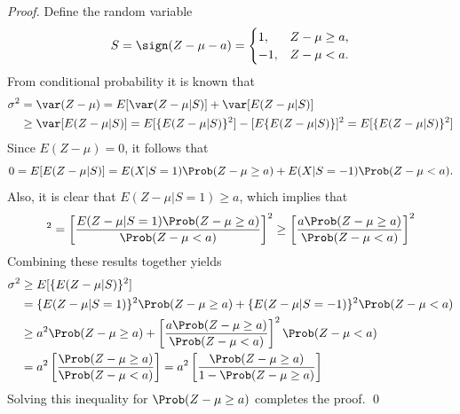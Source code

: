 \documentclass[graybox]{svmult}
\begin{document}
\begin{proof}Define the random variable
\[ S=\sign(Z - \mu - a) = \begin{cases} 1, & Z - \mu \geq a,\\ -1, & Z - \mu <a. \end{cases}
\]
From conditional probability it is known that
\begin{align*}
\sigma^2 &= \var(Z-\mu)=E[\var(Z-\mu|S)]+\var[E(Z-\mu|S)] \\
&\geq\var[E(Z-\mu|S)]= E[\{E(Z-\mu|S)\}^2]-[E\{E(Z-\mu|S)\}]^2 =  E[\{E(Z-\mu|S)\}^2]
\end{align*}
Since $E(Z-\mu)=0$, it follows that
\begin{equation*}
0= E[E(Z-\mu|S)]=E(X|S=1)\Prob(Z - \mu \geq a)+E(X|S=-1)\Prob(Z - \mu < a).
\end{equation*}
Also, it is clear that $E(Z - \mu|S=1) \ge a$, which implies that
\begin{equation*}
[E(Z - \mu|S=-1)]^2=\left[\frac{E(Z - \mu|S=1)\Prob(Z - \mu \geq a)}{\Prob(Z - \mu < a)}\right]^2\geq \left[\frac{a\Prob(Z - \mu \geq a)}{\Prob(Z - \mu < a)}\right]^2
\end{equation*}
Combining these results together yields
\begin{align*}
\sigma^2 & \ge E[\{E(Z-\mu|S)\}^2]\\
& =\{E(Z-\mu|S=1)\}^2 \Prob(Z - \mu \geq a) + \{E(Z-\mu|S=-1)\}^2 \Prob(Z - \mu < a) \\
& \ge a^2 \Prob(Z - \mu \geq a) + \left[\frac{a\Prob(Z - \mu \geq a)}{\Prob(Z - \mu < a)}\right]^2 \Prob(Z - \mu < a) \\
&= a^2 \left[\frac{ \Prob(Z - \mu \geq a)}{\Prob(Z - \mu < a)}\right] = a^2 \left[\frac{ \Prob(Z - \mu \geq a)}{1  - \Prob(Z - \mu \ge a)}\right]
\end{align*}
Solving this inequality for $\Prob(Z - \mu \geq a)$ completes the proof. \qed
\end{proof}
\end{document}
